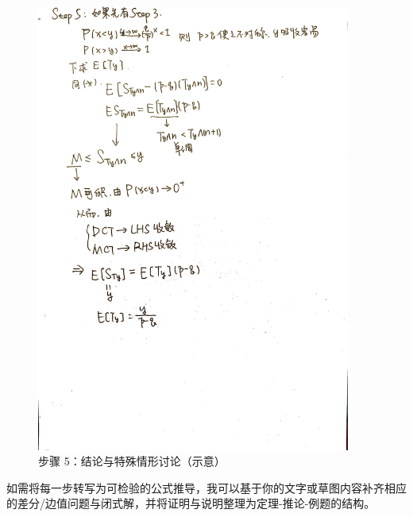 \documentclass[12pt, a4paper, oneside, fontset=windows]{ctexbook}
\begin{document}
\begin{figure}[h]
	\centering
	\includegraphics[width=0.92\textwidth]{5.jpg}
	\caption{步骤 5：结论与特殊情形讨论（示意）}\label{fig:rw-step5}
\end{figure}

\vspace{1em}
\noindent
如需将每一步转写为可检验的公式推导，我可以基于你的文字或草图内容补齐相应的差分/边值问题与闭式解，并将证明与说明整理为定理-推论-例题的结构。
\end{document}
